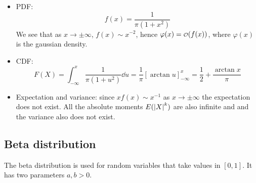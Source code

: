 \documentclass[12pt]{extarticle}
\begin{document}
\begin{itemize}
    \item PDF:
          \begin{equation}
              f(x) = \frac{1}{\pi (1 + x^2)}
          \end{equation}
          We see that as $x \to \pm \infty$, $f(x) \sim x^{-2}$, hence $\varphi(x) = \o(f(x))$, where $\varphi(x)$ is the gaussian density.
    \item CDF:
          \begin{equation}
              F(X) = \int_{-\infty}^{x} \frac{1}{\pi(1+u^2)} \dd{u} = \frac{1}{\pi} \left[\arctan u\right]_{-\infty}^x = \frac{1}{2} + \frac{\arctan x}{\pi}
          \end{equation}
    \item Expectation and variance: since $x f(x) \sim x^{-1}$ as $x \to \pm \infty$ the expectation does not exist. All the absolute moments $E(\abs{X}^k)$ are also infinite and and the variance also does not exist.
\end{itemize}

\subsection{Beta distribution}

The beta distribution is used for random variables that take values in $[0, 1]$.
It has two parameters $a, b \gt 0$.
\end{document}
